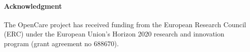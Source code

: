 \documentclass{llncs}
\begin{document}
%
%
%


\paragraph{Acknowledgment}
The OpenCare project has received funding from the European Research Council (ERC) under the European Union's Horizon 2020 research and innovation program (grant agreement no 688670).

%
%


\end{document}
